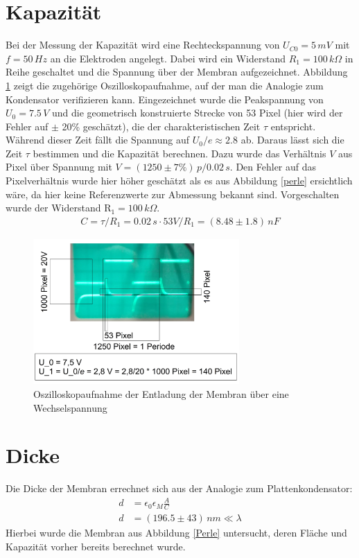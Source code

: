 \documentclass{include/thesisclass3}
\newcommand{\e}[1]{\,\si{#1}}
\begin{document}
\section{Kapazität}
Bei der Messung der Kapazität wird eine Rechteckspannung von $U_{C0}=5\e{mV}$ mit $f=50\e{Hz}$ an die Elektroden angelegt. Dabei wird ein Widerstand $R_1=100\e{k\Omega}$ in Reihe geschaltet und die Spannung über der Membran aufgezeichnet. Abbildung \ref{oszi} zeigt die zugehörige Oszilloskopaufnahme, auf der man die Analogie zum Kondensator verifizieren kann. Eingezeichnet wurde die Peakspannung von $U_0 = 7.5\e{V}$ und die geometrisch konstruierte Strecke von 53 Pixel (hier wird der Fehler auf $\pm$ 20\% geschätzt), die der charakteristischen Zeit $\tau$ entspricht. Während dieser Zeit fällt die Spannung auf $U_0/\textit{e}\approx 2.8$ ab. Daraus lässt sich die Zeit $\tau$ bestimmen und die Kapazität berechnen. Dazu wurde das Verhältnis $V$ aus Pixel über Spannung mit $V=(1250\pm7\%)\e{p}/0.02\e{s}$. Den Fehler auf das Pixelverhältnis wurde hier höher geschätzt als es aus Abbildung \ref{perle} ersichtlich wäre, da hier keine Referenzwerte zur Abmessung bekannt sind. Vorgeschalten wurde der Widerstand R$_1=100\e{k\Omega}$.
\begin{align}
C=\tau/ R_1 = 0.02\e{s}\cdot 53 V/R_1 = (8.48 \pm 1.8)\e{nF}
\end{align}
\begin{figure}[ht]
	\begin{center}
		\includegraphics[width=0.7\textwidth]{images/measure.png}
		\caption{Oszilloskopaufnahme der Entladung der Membran über eine Wechselspannung}
		\label{oszi}
	\end{center}
\end{figure}

\section{Dicke}
Die Dicke der Membran errechnet sich aus der Analogie zum Plattenkondensator:
\begin{align*}
	d&=\epsilon_0\epsilon_M \frac{A}{C}\\
	d&=(196.5 \pm 43)\e{nm} \ll \lambda
\end{align*}
Hierbei wurde die Membran aus Abbildung \ref{Perle} untersucht, deren Fläche und Kapazität vorher bereits berechnet wurde. 
\end{document}

